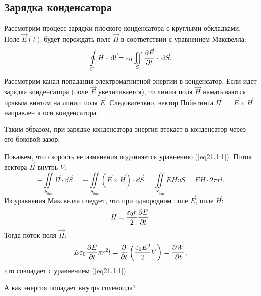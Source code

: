     \subsection{Зарядка конденсатора}

        Рассмотрим процесс зарядки плоского конденсатора с круглыми обкладками.
        Поле \( \vec{E}(t) \) будет порождать поле \( \vec{H} \) в соответствии
        с уравнением Максвелла:
        \[
            \oint\limits_C \vec{H}\cdot\,\mathrm{d}\vec{l} =
            \varepsilon_0\iint\limits_S \frac{\partial \vec{E}}{\partial t}\cdot\,\mathrm{d}\vec{S}.
        \]
        Рассмотрим канал попадания электромагнитной энергии в конденсатор. Если
        идет зарядка конденсатора (поле \( \vec{E} \) увеличивается), то линии
        поля \( \vec{H} \) наматываются правым винтом на линии поля
        \( \vec{E} \). Следовательно, вектор Пойнтинга
        \( \vec{\Pi}~=~\vec{E}\times\vec{H} \) направлен к оси конденсатора.
        
        Таким образом, при зарядке конденсатора энергия втекает в конденсатор
        через его боковой зазор:
        
        Покажем, что скорость ее изменения подчиняется уравнению
        (\ref{eq21.1:1}). Поток вектора \( \vec{\Pi} \) внутрь \( V \):
        \[
            -\iint\limits_{S_\textit{бок}} \vec{\Pi}\cdot\dd\vec{S} = 
            -\iint\limits_{S_\textit{бок}} (\vec{E}\times\vec{H})\cdot\dd\vec{S}
            = \iint\limits_{S_\textit{бок}} EH\dd S = EH\cdot2\pi rl.
        \]
        Из уравнения Максвелла следует, что при однородном поле \( \vec{E} \),
        поле \( \vec{H} \):
        \[
            H = \frac{\varepsilon_0 r}{2}\frac{\partial E}{\partial t}.
        \]
        Тогда поток поля \( \vec{\Pi} \):
        \[
            E\varepsilon_0\frac{\partial E}{\partial t}\pi r^2 l =
            \frac{\partial }{\partial t}\left(\frac{\varepsilon_0 E^2}{2}V\right) = \frac{\partial W}{\partial t},
        \]
        что совпадает с уравнением (\ref{eq21.1:1}).
        
        \begin{example}
            А как энергия попадает внутрь соленоида?
        \end{example}


